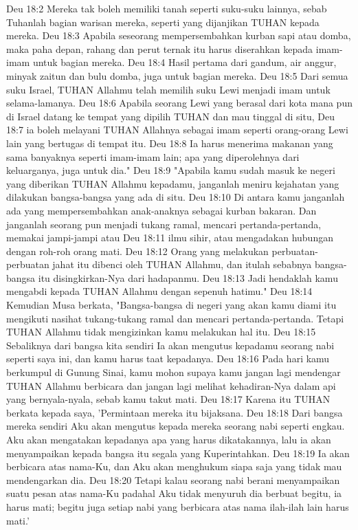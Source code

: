 Deu 18:2  Mereka tak boleh memiliki tanah seperti suku-suku lainnya, sebab Tuhanlah bagian warisan mereka, seperti yang dijanjikan TUHAN kepada mereka.
Deu 18:3  Apabila seseorang mempersembahkan kurban sapi atau domba, maka paha depan, rahang dan perut ternak itu harus diserahkan kepada imam-imam untuk bagian mereka.
Deu 18:4  Hasil pertama dari gandum, air anggur, minyak zaitun dan bulu domba, juga untuk bagian mereka.
Deu 18:5  Dari semua suku Israel, TUHAN Allahmu telah memilih suku Lewi menjadi imam untuk selama-lamanya.
Deu 18:6  Apabila seorang Lewi yang berasal dari kota mana pun di Israel datang ke tempat yang dipilih TUHAN dan mau tinggal di situ,
Deu 18:7  ia boleh melayani TUHAN Allahnya sebagai imam seperti orang-orang Lewi lain yang bertugas di tempat itu.
Deu 18:8  Ia harus menerima makanan yang sama banyaknya seperti imam-imam lain; apa yang diperolehnya dari keluarganya, juga untuk dia."
Deu 18:9  "Apabila kamu sudah masuk ke negeri yang diberikan TUHAN Allahmu kepadamu, janganlah meniru kejahatan yang dilakukan bangsa-bangsa yang ada di situ.
Deu 18:10  Di antara kamu janganlah ada yang mempersembahkan anak-anaknya sebagai kurban bakaran. Dan janganlah seorang pun menjadi tukang ramal, mencari pertanda-pertanda, memakai jampi-jampi atau
Deu 18:11  ilmu sihir, atau mengadakan hubungan dengan roh-roh orang mati.
Deu 18:12  Orang yang melakukan perbuatan-perbuatan jahat itu dibenci oleh TUHAN Allahmu, dan itulah sebabnya bangsa-bangsa itu disingkirkan-Nya dari hadapanmu.
Deu 18:13  Jadi hendaklah kamu mengabdi kepada TUHAN Allahmu dengan sepenuh hatimu."
Deu 18:14  Kemudian Musa berkata, "Bangsa-bangsa di negeri yang akan kamu diami itu mengikuti nasihat tukang-tukang ramal dan mencari pertanda-pertanda. Tetapi TUHAN Allahmu tidak mengizinkan kamu melakukan hal itu.
Deu 18:15  Sebaliknya dari bangsa kita sendiri Ia akan mengutus kepadamu seorang nabi seperti saya ini, dan kamu harus taat kepadanya.
Deu 18:16  Pada hari kamu berkumpul di Gunung Sinai, kamu mohon supaya kamu jangan lagi mendengar TUHAN Allahmu berbicara dan jangan lagi melihat kehadiran-Nya dalam api yang bernyala-nyala, sebab kamu takut mati.
Deu 18:17  Karena itu TUHAN berkata kepada saya, 'Permintaan mereka itu bijaksana.
Deu 18:18  Dari bangsa mereka sendiri Aku akan mengutus kepada mereka seorang nabi seperti engkau. Aku akan mengatakan kepadanya apa yang harus dikatakannya, lalu ia akan menyampaikan kepada bangsa itu segala yang Kuperintahkan.
Deu 18:19  Ia akan berbicara atas nama-Ku, dan Aku akan menghukum siapa saja yang tidak mau mendengarkan dia.
Deu 18:20  Tetapi kalau seorang nabi berani menyampaikan suatu pesan atas nama-Ku padahal Aku tidak menyuruh dia berbuat begitu, ia harus mati; begitu juga setiap nabi yang berbicara atas nama ilah-ilah lain harus mati.'
